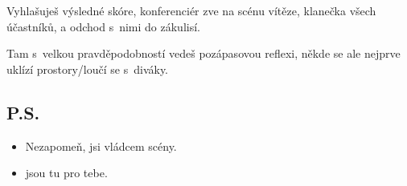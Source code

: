 Vyhlašuješ výsledné skóre, konferenciér zve na scénu vítěze, klanečka všech účastníků, a odchod s~nimi do zákulisí. 
 
Tam s~velkou pravděpodobností vedeš pozápasovou reflexi, někde se ale nejprve uklízí prostory/loučí se s~diváky. 
 
\subsection{ P.S. } \begin{itemize}
\item  Nezapomeň, jsi vládcem scény.
\item  {} jsou tu pro tebe.
\end{itemize}

